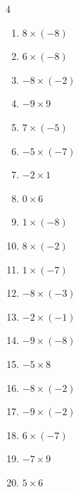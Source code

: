 \begin{multicols}{4}
\begin{enumerate}
  \item $8\times (-8)$
        \phantom{$=-64$}

  \item $6\times (-8)$
        \phantom{$=-48$}

  \item $-8\times (-2)$
        \phantom{$=16$}

  \item $-9\times 9$
        \phantom{$=-81$}

  \item $7\times (-5)$
        \phantom{$=-35$}

  \item $-5\times (-7)$
        \phantom{$=35$}

  \item $-2\times 1$
        \phantom{$=-2$}

  \item $0\times 6$
        \phantom{$=0$}

  \item $1\times (-8)$
        \phantom{$=-8$}

  \item $8\times (-2)$
        \phantom{$=-16$}

  \item $1\times (-7)$
        \phantom{$=-7$}

\columnbreak %

  \item $-8\times (-3)$
        \phantom{$=24$}

  \item $-2\times (-1)$
        \phantom{$=2$}

  \item $-9\times (-8)$
        \phantom{$=72$}

  \item $-5\times 8$
        \phantom{$=-40$}

  \item $-8\times (-2)$
        \phantom{$=16$}

  \item $-9\times (-2)$
        \phantom{$=18$}

  \item $6\times (-7)$
        \phantom{$=-42$}

  \item $-7\times 9$
        \phantom{$=-63$}

  \item $5\times 6$
        \phantom{$=30$}


\end{enumerate}
\end{multicols}
